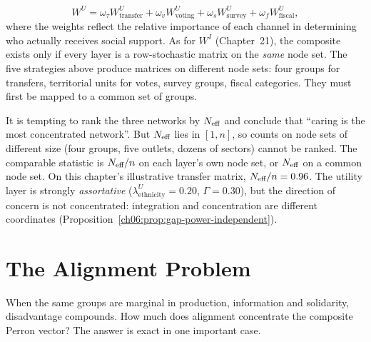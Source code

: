 \documentclass[../structural_economics_book.tex]{subfiles}
\begin{document}
\begin{definition}\label{ch22:def:composite}
\begin{equation}\label{ch22:eq:composite}
W^U = \omega_\tau W^U_{\text{transfer}} + \omega_v W^U_{\text{voting}} + \omega_s W^U_{\text{survey}} + \omega_f W^U_{\text{fiscal}},
\end{equation}
where the weights reflect the relative importance of each channel in determining who actually receives social support. As for $W^I$ (Chapter~21), the composite exists only if every layer is a row-stochastic matrix on the \emph{same} node set. The five strategies above produce matrices on different node sets: four groups for transfers, territorial units for votes, survey groups, fiscal categories. They must first be mapped to a common set of groups.
\end{definition}

\begin{remark}\label{ch22:ex:composite}
It is tempting to rank the three networks by $N_{\text{eff}}$ and conclude that ``caring is the most concentrated network''. But $N_{\text{eff}}$ lies in $[1, n]$, so counts on node sets of different size (four groups, five outlets, dozens of sectors) cannot be ranked. The comparable statistic is $N_{\text{eff}}/n$ on each layer's own node set, or $N_{\text{eff}}$ on a common node set. On this chapter's illustrative transfer matrix, $N_{\text{eff}}/n = 0.96$. The utility layer is strongly \emph{assortative} ($\lambda^U_{\text{ethnicity}} = 0.20$, $\Gamma = 0.30$), but the direction of concern is not concentrated: integration and concentration are different coordinates (Proposition~\ref{ch06:prop:gap-power-independent}).
\end{remark}


\section{The Alignment Problem}
\label{ch22:sec:alignment}

When the same groups are marginal in production, information and solidarity, disadvantage compounds. How much does alignment concentrate the composite Perron vector? The answer is exact in one important case.
\end{document}
